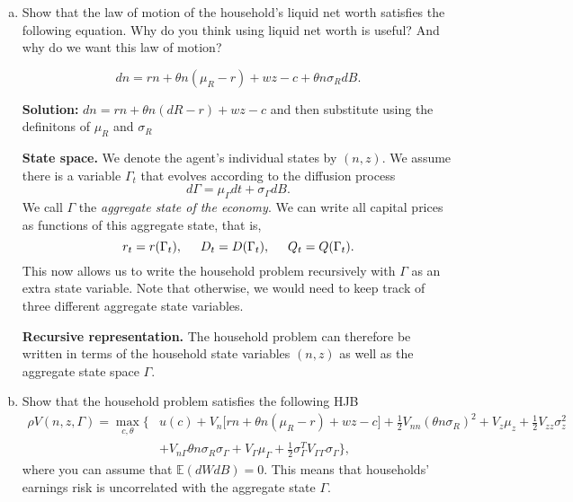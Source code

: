 \documentclass[11pt]{extarticle}
\theoremstyle{plain}
\theoremstyle{definition}
\begin{document}
\begin{enumerate}[(a)]
\item Show that the law of motion of the household's liquid net worth satisfies the following equation. Why do you think using liquid net worth is useful? And why do we want this law of motion?

\begin{equation*}
	dn = rn + \theta n (\mu_R - r) + wz - c + \theta n \sigma_R dB. 
\end{equation*}


\textbf{Solution:}
 $dn = rn + \theta n (dR - r) + wz - c$ and then substitute using the definitons of $\mu_R$ and $\sigma_R$

\vspace{5mm}
\noindent
\textbf{State space.} We denote the agent's individual states by $(n, z)$. We assume there is a variable $\Gamma_t$ that evolves according to the diffusion process 
\begin{equation*}
	d \Gamma = \mu_\Gamma dt + \sigma_\Gamma dB.
\end{equation*}
We call $\Gamma$ the \textit{aggregate state of the economy}. We can write all capital prices as functions of this aggregate state, that is, 
\begin{equation*}
	r_t = r(\Gamma_t), \hspace{5mm}	D_t = D(\Gamma_t), \hspace{5mm}	Q_t = Q(\Gamma_t).
\end{equation*}
This now allows us to write the household problem recursively with $\Gamma$ as an extra state variable. Note that otherwise, we would need to keep track of three different aggregate state variables. 


\vspace{5mm}
\noindent
\textbf{Recursive representation.} 
The household problem can therefore be written in terms of the household state variables $(n,z)$ as well as the aggregate state space $\Gamma$. 
\item Show that the household problem satisfies the following HJB
\begin{align*}
	\rho V(n,z,\Gamma) = \max_{c,\theta} \bigg\{  & u(c) + V_n \Big[ rn + \theta n (\mu_R - r) + wz - c \Big] + \frac{1}{2} V_{nn} (\theta n \sigma_R)^2 +  V_z \mu_z + \frac{1}{2} V_{zz} \sigma_z^2  \\
	& + V_{n \Gamma} \theta n \sigma_R \sigma_\Gamma + V_\Gamma \mu_\Gamma + \frac{1}{2} \sigma_\Gamma^T V_{\Gamma \Gamma} \sigma_\Gamma \bigg\},
\end{align*}
where you can assume that $\mathbb{E}(dW dB) = 0$. This means that households' earnings risk is uncorrelated with the aggregate state $\Gamma$.


\end{enumerate}
\end{document}
